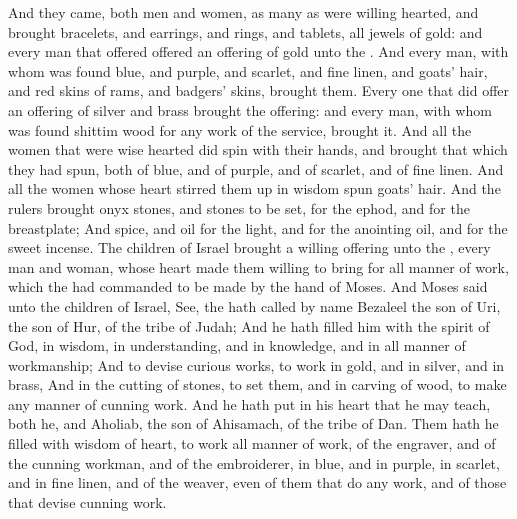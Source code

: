 \begin{biblechapter}
\verse And they came, both men and women, as many as were willing hearted, and brought bracelets, and earrings, and rings, and tablets, all jewels of gold: and every man that offered offered an offering of gold unto the \LORD.
\verse And every man, with whom was found blue, and purple, and scarlet, and fine linen, and goats' hair, and red skins of rams, and badgers' skins, brought them.
\verse Every one that did offer an offering of silver and brass brought the \LORDs offering: and every man, with whom was found shittim wood for any work of the service, brought it.
\verse And all the women that were wise hearted did spin with their hands, and brought that which they had spun, both of blue, and of purple, and of scarlet, and of fine linen.
\verse And all the women whose heart stirred them up in wisdom spun goats' hair.
\verse And the rulers brought onyx stones, and stones to be set, for the ephod, and for the breastplate;
\verse And spice, and oil for the light, and for the anointing oil, and for the sweet incense.
\verse The children of Israel brought a willing offering unto the \LORD, every man and woman, whose heart made them willing to bring for all manner of work, which the \LORD had commanded to be made by the hand of Moses.
 And Moses said unto the children of Israel, See, the \LORD hath called by name Bezaleel the son of Uri, the son of Hur, of the tribe of Judah;
\verse And he hath filled him with the spirit of God, in wisdom, in understanding, and in knowledge, and in all manner of workmanship;
\verse And to devise curious works, to work in gold, and in silver, and in brass,
\verse And in the cutting of stones, to set them, and in carving of wood, to make any manner of cunning work.
\verse And he hath put in his heart that he may teach, both he, and Aholiab, the son of Ahisamach, of the tribe of Dan.
\verse Them hath he filled with wisdom of heart, to work all manner of work, of the engraver, and of the cunning workman, and of the embroiderer, in blue, and in purple, in scarlet, and in fine linen, and of the weaver, even of them that do any work, and of those that devise cunning work.
\end{biblechapter}

